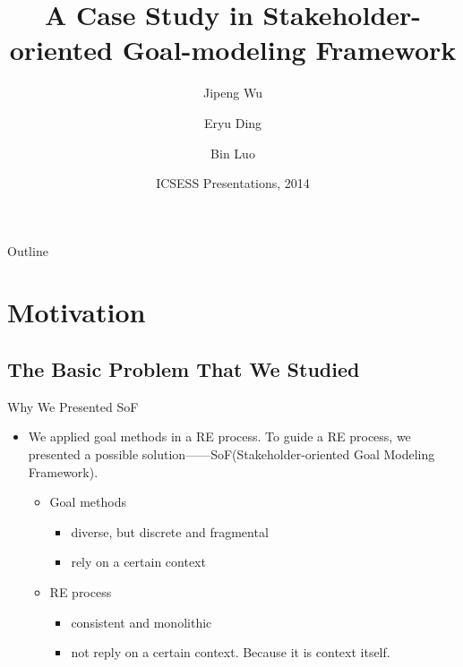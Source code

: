 \documentclass{beamer}
\title[A Case Study in SoF] {A Case Study in Stakeholder-oriented Goal-modeling Framework}
\subtitle{}
\author[Author]{Jipeng Wu \and Eryu Ding \and Bin Luo}
\institute[Universities of Somewhere and Elsewhere] {
                                 Software Institute\\
                                 Nanjing University
     }
\date[ICSESS 2014]
{ICSESS Presentations, 2014}
\begin{document}
\begin{frame}
  \titlepage
\end{frame}

\begin{frame}{Outline}
  \tableofcontents
\end{frame}

\section{Motivation}
\subsection{The Basic Problem That We Studied}
\begin{frame}{Why We Presented SoF}              %
  \begin{itemize}
  \item
    We applied goal methods in a RE process. To guide a RE process, we presented a possible solution——SoF(Stakeholder-oriented Goal Modeling Framework).\pause
    \begin{itemize}
    \item Goal methods
      \begin{itemize}
      \item diverse, but discrete and fragmental  
      \item rely on a certain context \pause
      \end{itemize}
    \item RE process 
      \begin{itemize}
      \item consistent and monolithic \pause
      \item not reply on a certain context. \pause  Because it is context itself.
      \end{itemize}
    \end{itemize}
  \end{itemize}
\end{frame}
\end{document}
